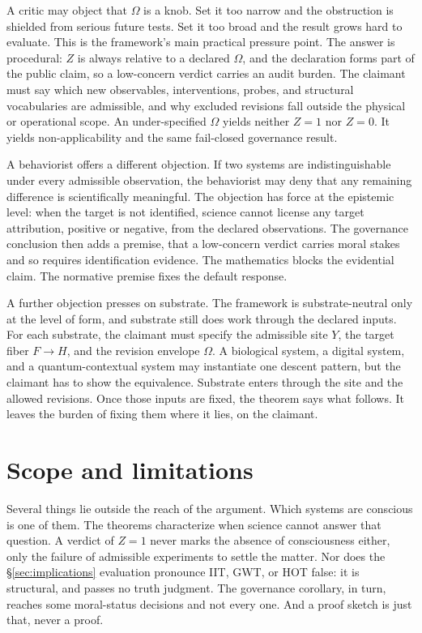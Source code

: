 \documentclass[11pt]{article}
\begin{document}
A critic may object that $\Omega$ is a knob. Set it too narrow and the
obstruction is shielded from serious future tests. Set it too broad and the
result grows hard to evaluate. This is the framework's main practical pressure
point. The answer is procedural: $Z$ is always relative to a declared $\Omega$,
and the declaration forms part of the public claim, so a low-concern verdict
carries an audit burden. The claimant must say which new observables,
interventions, probes, and structural vocabularies are admissible, and why
excluded revisions fall outside the physical or operational scope. An
under-specified $\Omega$ yields neither $Z = 1$ nor $Z = 0$. It yields
non-applicability and the same fail-closed governance result.

A behaviorist offers a different objection. If two systems are indistinguishable
under every admissible observation, the behaviorist may deny that any remaining
difference is scientifically meaningful. The objection has force at the
epistemic level: when the target is not identified, science cannot license any
target attribution, positive or negative, from the declared observations. The
governance conclusion then adds a premise, that a low-concern verdict carries
moral stakes and so requires identification evidence. The
mathematics blocks the evidential claim. The normative premise fixes the
default response.

A further objection presses on substrate. The framework is substrate-neutral only
at the level of form, and substrate still does work through the declared inputs.
For each substrate, the claimant must specify the admissible site $Y$, the target
fiber $F \to H$, and the revision envelope $\Omega$. A biological system, a
digital system, and a quantum-contextual system may instantiate one descent
pattern, but the claimant has to show the equivalence. Substrate enters through
the site and the allowed revisions. Once those inputs are fixed, the theorem says
what follows. It leaves the burden of fixing them where it lies, on the claimant.

\section{Scope and limitations}
\label{sec:limits}

Several things lie outside the reach of the argument. Which systems are
conscious is one of them. The theorems characterize when science cannot
answer that question. A verdict of $Z = 1$ never marks the absence of
consciousness either, only the failure of admissible experiments to settle the
matter. Nor does the \S\ref{sec:implications} evaluation pronounce IIT, GWT, or
HOT false: it is structural, and passes no truth judgment. The governance
corollary, in turn, reaches some moral-status decisions and not every one. And a
proof sketch is just that, never a proof.
\end{document}
